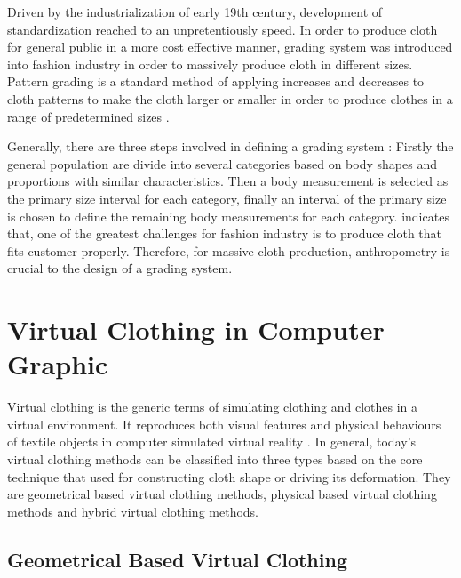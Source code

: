 Driven by the industrialization of early 19th century, development of standardization reached to an unpretentiously speed. In order to produce cloth for general public in a more cost effective manner, grading system was introduced into fashion industry in order to massively produce cloth in different sizes. Pattern grading is a standard method of applying increases and decreases to cloth patterns to make the cloth larger or smaller in order to produce clothes in a range of predetermined sizes .
 
Generally, there are three steps involved in defining a grading system  : Firstly the general population are divide into several categories based on body shapes and proportions with similar characteristics. Then a body measurement is selected as the primary size interval for each category, finally an interval of the primary size is chosen to define the remaining body measurements for each category.  indicates that, one of the greatest challenges for fashion industry is to produce cloth that fits customer properly. Therefore, for massive cloth production, anthropometry is crucial to the design of a grading system. 
 
\section{Virtual Clothing in Computer Graphic}

Virtual clothing is the generic terms of simulating clothing and clothes in a virtual environment. It reproduces both visual features and physical behaviours of textile objects in computer simulated virtual reality . In general, today's virtual clothing methods can be classified into three types based on the core technique that used for constructing cloth shape or driving its deformation. They are geometrical based virtual clothing methods, physical based virtual clothing methods and hybrid virtual clothing methods. 


\subsection{Geometrical Based Virtual Clothing}

